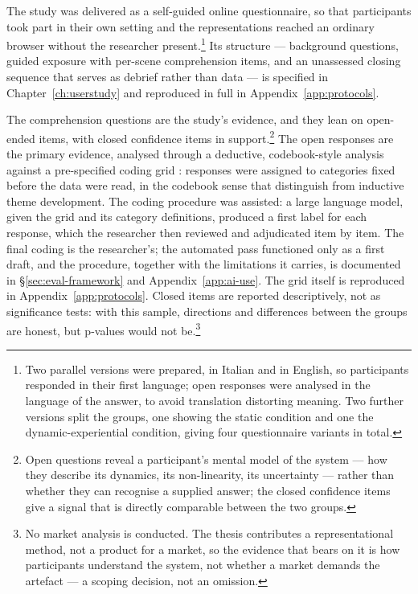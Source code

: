 The study was delivered as a self-guided online questionnaire, so that participants took part in their own setting and the representations reached an ordinary browser without the researcher present.\footnote{Two parallel versions were prepared, in Italian and in English, so participants responded in their first language; open responses were analysed in the language of the answer, to avoid translation distorting meaning. Two further versions split the groups, one showing the static condition and one the dynamic-experiential condition, giving four questionnaire variants in total.} Its structure --- background questions, guided exposure with per-scene comprehension items, and an unassessed closing sequence that serves as debrief rather than data --- is specified in Chapter~\ref{ch:userstudy} and reproduced in full in Appendix~\ref{app:protocols}.

The comprehension questions are the study's evidence, and they lean on open-ended items, with closed confidence items in support.\footnote{Open questions reveal a participant's mental model of the system --- how they describe its dynamics, its non-linearity, its uncertainty --- rather than whether they can recognise a supplied answer; the closed confidence items give a signal that is directly comparable between the two groups.} The open responses are the primary evidence, analysed through a deductive, codebook-style analysis against a pre-specified coding grid \citep{braunclarke2019}: responses were assigned to categories fixed before the data were read, in the codebook sense that \textcite{braunclarke2019} distinguish from inductive theme development. The coding procedure was assisted: a large language model, given the grid and its category definitions, produced a first label for each response, which the researcher then reviewed and adjudicated item by item. The final coding is the researcher's; the automated pass functioned only as a first draft, and the procedure, together with the limitations it carries, is documented in \S\ref{sec:eval-framework} and Appendix~\ref{app:ai-use}. The grid itself is reproduced in Appendix~\ref{app:protocols}. Closed items are reported descriptively, not as significance tests: with this sample, directions and differences between the groups are honest, but p-values would not be.\footnote{No market analysis is conducted. The thesis contributes a representational method, not a product for a market, so the evidence that bears on it is how participants understand the system, not whether a market demands the artefact --- a scoping decision, not an omission.}

